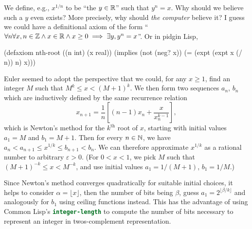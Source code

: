 We define, e.g., $x^{1/n}$ to be ``the $y\in\mathbb{R}$'' such that $y^{n}=x$.
Why should we believe such a $y$ even exists? More precisely, why should
\emph{the computer} believe it? I guess we could have a definitional
axiom of the form ``$\forall n\forall x, n\in\mathbb{Z}\land x\in\mathbb{R}\land x\geq0\implies\exists y,y^{n}=x$''.
Or in pidgin Lisp,

\begin{lisp-example}
(defaxiom nth-root ((n int) (x real))
  (implies (not (neg? x))
           (= (expt (expt x (/ n)) n) x)))
\end{lisp-example}

Euler seemed to adopt the perspective that we could, for any $x\geq1$,
find an integer $M$ such that $M^{k}\leq x < (M+1)^{k}$. We then form
two sequences $a_{n}$, $b_{n}$ which are inductively defined by the same
recurrence relation
\begin{equation}
x_{n+1} = \frac{1}{n}\left[(n-1)x_{n} + \frac{x}{x_{n}^{k-1}}\right],
\end{equation}
which is Newton's method for the $k^{\text{th}}$ root of $x$, starting
with initial values $a_{1}=M$ and $b_{1}=M+1$. Then for every $n\in\mathbb{N}$,
we have $a_{n}<a_{n+1}\leq x^{1/k}\leq b_{n+1}<b_{n}$. We can therefore
approximate $x^{1/k}$ as a rational number to arbitrary $\varepsilon>0$.
(For $0<x<1$, we pick $M$ such that $(M+1)^{-k}\leq x < M^{-k}$,
and use initial values $a_{1} = 1/(M + 1)$, $b_{1} = 1/M$.)

Since Newton's method converges quadratically for suitable initial
choices, it helps to consider $\alpha = \lfloor x\rfloor$, then the
number of bits being $\beta$, guess $a_{1}=2^{\lfloor \beta/k\rfloor}$
and analogously for $b_{1}$ using ceiling functions instead. This has
the advantage of using Common Lisp's \lstinline[language=lisp]{integer-length}
to compute the number of bits necessary to represent an integer in
twos-complement representation.

